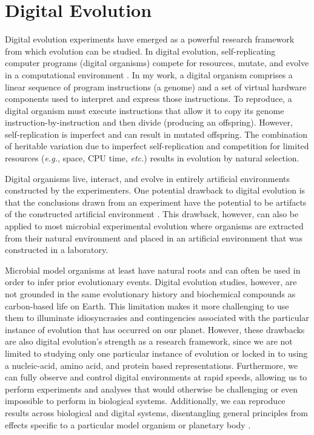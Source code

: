\section{Digital Evolution}

Digital evolution experiments have emerged as a powerful research framework from which evolution can be studied.
In digital evolution, self-replicating computer programs (digital organisms) compete for resources, mutate, and evolve in a computational environment \citep{wilke_biology_2002}.
In my work, a digital organism comprises a linear sequence of program instructions (a genome) and a set of virtual hardware components used to interpret and express those instructions. 
To reproduce, a digital organism must execute instructions that allow it to copy its genome instruction-by-instruction and then divide (producing an offspring).
However, self-replication is imperfect and can result in mutated offspring.
The combination of heritable variation due to imperfect self-replication and competition for limited resources (\textit{e.g.}, space, CPU time, \textit{etc.}) results in evolution by natural selection.

Digital organisms live, interact, and evolve in entirely artificial environments constructed by the experimenters.
One potential drawback to digital evolution is that the conclusions drawn from an experiment have the potential to be artifacts of the constructed artificial environment \citep{wilke_biology_2002}.
This drawback, however, can also be applied to most microbial experimental evolution where organisms are extracted from their natural environment and placed in an artificial environment that was constructed in a laboratory.

Microbial model organisms at least have natural roots and can often be used in order to infer prior evolutionary events.
Digital evolution studies, however, are not grounded in the same evolutionary history and biochemical compounds as carbon-based life on Earth.
This limitation makes it more challenging to use them to illuminate idiosyncrasies and contingencies associated with the particular instance of evolution that has occurred on our planet.
However, these drawbacks are also digital evolution's strength as a research framework, since we are not limited to studying only one particular instance of evolution or locked in to using a nucleic-acid, amino acid, and protein based representations.
Furthermore, we can fully observe and control digital environments at rapid speeds, allowing us to perform experiments and analyses that would otherwise be challenging or even impossible to perform in biological systems.
Additionally, we can reproduce results across biological and digital systems, disentangling general principles from effects specific to a particular model organism or planetary body \citep{wilke_biology_2002}.

